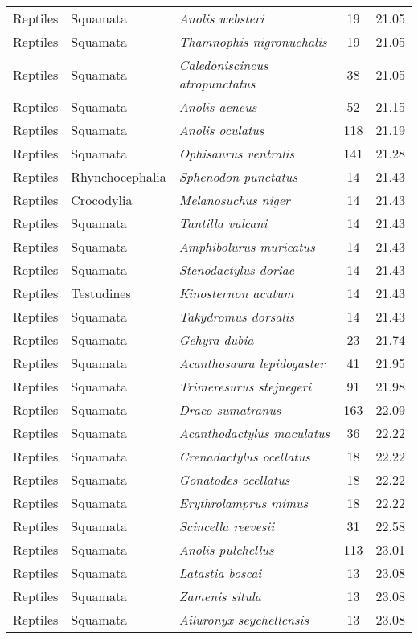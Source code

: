 \begin{longtable}{ll>{\itshape}lcc}
  Reptiles & Squamata & Anolis websteri &  19 & 21.05 \\ 
  Reptiles & Squamata & Thamnophis nigronuchalis &  19 & 21.05 \\ 
  Reptiles & Squamata & Caledoniscincus atropunctatus &  38 & 21.05 \\ 
  Reptiles & Squamata & Anolis aeneus &  52 & 21.15 \\ 
  Reptiles & Squamata & Anolis oculatus & 118 & 21.19 \\ 
  Reptiles & Squamata & Ophisaurus ventralis & 141 & 21.28 \\ 
  Reptiles & Rhynchocephalia & Sphenodon punctatus &  14 & 21.43 \\ 
  Reptiles & Crocodylia & Melanosuchus niger &  14 & 21.43 \\ 
  Reptiles & Squamata & Tantilla vulcani &  14 & 21.43 \\ 
  Reptiles & Squamata & Amphibolurus muricatus &  14 & 21.43 \\ 
  Reptiles & Squamata & Stenodactylus doriae &  14 & 21.43 \\ 
  Reptiles & Testudines & Kinosternon acutum &  14 & 21.43 \\ 
  Reptiles & Squamata & Takydromus dorsalis &  14 & 21.43 \\ 
  Reptiles & Squamata & Gehyra dubia &  23 & 21.74 \\ 
  Reptiles & Squamata & Acanthosaura lepidogaster &  41 & 21.95 \\ 
  Reptiles & Squamata & Trimeresurus stejnegeri &  91 & 21.98 \\ 
  Reptiles & Squamata & Draco sumatranus & 163 & 22.09 \\ 
  Reptiles & Squamata & Acanthodactylus maculatus &  36 & 22.22 \\ 
  Reptiles & Squamata & Crenadactylus ocellatus &  18 & 22.22 \\ 
  Reptiles & Squamata & Gonatodes ocellatus &  18 & 22.22 \\ 
  Reptiles & Squamata & Erythrolamprus mimus &  18 & 22.22 \\ 
  Reptiles & Squamata & Scincella reevesii &  31 & 22.58 \\ 
  Reptiles & Squamata & Anolis pulchellus & 113 & 23.01 \\ 
  Reptiles & Squamata & Latastia boscai &  13 & 23.08 \\ 
  Reptiles & Squamata & Zamenis situla &  13 & 23.08 \\ 
  Reptiles & Squamata & Ailuronyx seychellensis &  13 & 23.08 \\ 

\end{longtable}

